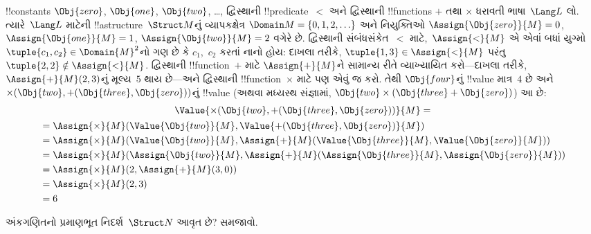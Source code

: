 \documentclass[../../../include/open-logic-section]{subfiles}
\begin{document}
\begin{ex}
!!{constant}s $\Obj{zero}$, $\Obj{one}$, $\Obj{two}$, \dots,
દ્વિસ્થાની !!{predicate}~$<$ અને દ્વિસ્થાની !!{function}s $+$ તથા
$\times$ ધરાવતી ભાષા~$\Lang L$ લો. ત્યારે~$\Lang L$ માટેની
!!a{structure}~$\Struct M$નું વ્યાપકક્ષેત્ર $\Domain M = \{0, 1, 2, \ldots
\}$ અને નિયુક્તિઓ $\Assign{\Obj{zero}}{M} = 0$,
$\Assign{\Obj{one}}{M} = 1$, $\Assign{\Obj{two}}{M} = 2$ વગેરે છે.
દ્વિસ્થાની સંબંધસંકેત~$<$ માટે,~$\Assign{<}{M}$ એ એવાં બધાં યુગ્મો
$\tuple{c_1, c_2} \in \Domain{M}^2$નો ગણ છે કે $c_1$,~$c_2$ કરતાં
નાનો હોય: દાખલા તરીકે, $\tuple{1, 3} \in \Assign{<}{M}$ પરંતુ
$\tuple{2, 2} \notin \Assign{<}{M}$. દ્વિસ્થાની !!{function}~$+$
માટે $\Assign{+}{M}$ને સામાન્ય રીતે વ્યાખ્યાયિત કરો---દાખલા તરીકે,
$\Assign{+}{M}(2,3)$નું મૂલ્ય~$5$ થાય છે---અને દ્વિસ્થાની
!!{function}~$\times$ માટે પણ એવું જ કરો. તેથી $\Obj{four}$નું
!!{value} માત્ર~$4$ છે અને $\times(\Obj{two},
+(\Obj{three},\Obj{zero}))$નું !!{value} (અથવા મધ્યસ્થ સંજ્ઞામાં,
$\Obj{two} \times (\Obj{three} + \Obj{zero})$) આ છે:
\begin{multline*}
\Value{\times(\Obj{two}, +(\Obj{three},\Obj{zero}))}{M} =\\
\begin{aligned}
& =\Assign{\times}{M}(\Value{\Obj{two}}{M}, \Value{+(\Obj{three}, \Obj{zero})}{M})\\
& = \Assign{\times}{M}(\Value{\Obj{two}}{M}, \Assign{+}{M}(\Value{\Obj{three}}{M},
\Value{\Obj{zero}}{M})) \\
& = \Assign{\times}{M}(\Assign{\Obj{two}}{M}, \Assign{+}{M}(\Assign{\Obj{three}}{M},
\Assign{\Obj{zero}}{M})) \\
& = \Assign{\times}{M}(2, \Assign{+}{M}(3, 0)) \\
& = \Assign{\times}{M}(2, 3) \\
& = 6
\end{aligned}
\end{multline*}
\end{ex}

\begin{prob}
અંકગણિતનો પ્રમાણભૂત નિદર્શ~$\Struct N$ આવૃત છે? સમજાવો.
\end{prob}
\end{document}
